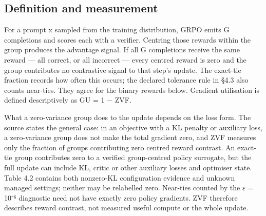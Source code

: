 \documentclass[12pt,a4paper]{report}
\begin{document}
\subsection{Definition and
measurement}\label{definition-and-measurement}

For a prompt x sampled from the training distribution, GRPO emits G
completions and scores each with a verifier. Centring those rewards
within the group produces the advantage signal. If all G completions
receive the same reward --- all correct, or all incorrect --- every
centred reward is zero and the group contributes no contrastive signal
to that step's update. The exact-tie fraction records how often this
occurs; the declared tolerance rule in §4.3 also counts near-ties. They
agree for the binary rewards below. Gradient utilisation is defined
descriptively as GU = 1 − ZVF.

What a zero-variance group does to the update depends on the loss form.
The source states the general case: in an objective with a KL penalty or
auxiliary loss, a zero-variance group does not make the total gradient
zero, and ZVF measures only the fraction of groups contributing zero
centred reward contrast. An exact-tie group contributes zero to a
verified group-centred policy surrogate, but the full update can include
KL, critic or other auxiliary losses and optimiser state. Table 4.2
contains both nonzero-KL configuration evidence and unknown managed
settings; neither may be relabelled zero. Near-ties counted by the ε =
10⁻⁶ diagnostic need not have exactly zero policy gradients. ZVF
therefore describes reward contrast, not measured useful compute or the
whole update.
\end{document}
